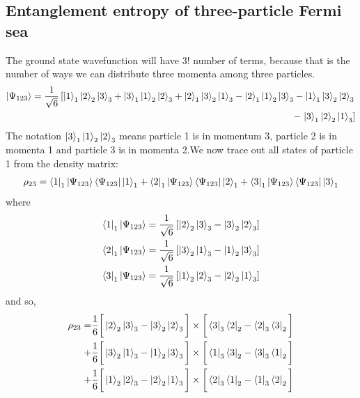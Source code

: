 \documentclass[12pt,twoside]{article}
\numberwithin{equation}{section}
\begin{document}
{\subsection{Entanglement entropy of three-particle Fermi sea}
The ground state wavefunction will have \(3!\) number of terms, because that is the number of ways we can distribute three momenta among three particles.
\begin{equation}\begin{aligned}
	\ket{\Psi_{123}} = \frac{1}{\sqrt 6}\left[\ket{1}_1\ket{2}_2\ket{3}_3 + \ket{3}_1\ket{1}_2\ket{2}_3 + \ket{2}_1\ket{3}_2\ket{1}_3 - \ket{2}_1\ket{1}_2\ket{3}_3 - \ket{1}_1\ket{3}_2\ket{2}_3 \right.\\
	- \left.\ket{3}_1\ket{2}_2\ket{1}_3\right]
\end{aligned}\end{equation}
The notation \(\ket{3}_1\ket{1}_2\ket{2}_3\) means particle 1 is in momentum 3, particle 2 is in momenta 1 and particle 3 is in momenta 2.We now trace out all states of particle 1 from the density matrix:
\begin{equation}\begin{aligned}
	\rho_{23} = \bra{1}_1\ket{\Psi_{123}}\bra{\Psi_{123}}\ket{1}_1 + \bra{2}_1\ket{\Psi_{123}}\bra{\Psi_{123}}\ket{2}_1 + \bra{3}_1\ket{\Psi_{123}}\bra{\Psi_{123}}\ket{3}_1
\end{aligned}\end{equation}
where
\begin{equation}\begin{aligned}
	\bra{1}_1\ket{\Psi_{123}} &= \frac{1}{\sqrt 6}\left[\ket{2}_2\ket{3}_3 - \ket{3}_2\ket{2}_3\right] \\
	\bra{2}_1\ket{\Psi_{123}} &= \frac{1}{\sqrt 6}\left[\ket{3}_2\ket{1}_3 - \ket{1}_2\ket{3}_3\right] \\
	\bra{3}_1\ket{\Psi_{123}} &= \frac{1}{\sqrt 6}\left[\ket{1}_2\ket{2}_3 - \ket{2}_2\ket{1}_3\right] \\
\end{aligned}\end{equation}
and so,
\begin{equation}\begin{aligned}
	\rho_{23} = &\frac{1}{6}\bigg[\ket{2}_2\ket{3}_3 - \ket{3}_2\ket{2}_3\bigg]\times\bigg[\bra{3}_3\bra{2}_2 - \bra{2}_3\bra{3}_2\bigg] \\
	+ &\frac{1}{6}\bigg[\ket{3}_2\ket{1}_3 - \ket{1}_2\ket{3}_3\bigg]\times\bigg[\bra{1}_3\bra{3}_2 - \bra{3}_3\bra{1}_2\bigg] \\
	+ &\frac{1}{6}\bigg[\ket{1}_2\ket{2}_3 - \ket{2}_2\ket{1}_3\bigg]\times\bigg[\bra{2}_3\bra{1}_2 - \bra{1}_3\bra{2}_2\bigg]

\end{aligned}
\end{equation}}
\end{document}
